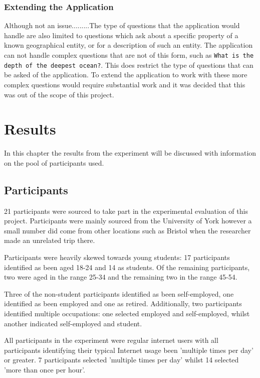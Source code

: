 \documentclass[authoryearcitations]{UoYCSproject}
\begin{document}
\subsection{Extending the Application}
 

Although not an issue.........The type of questions that the application would handle are also limited to questions which ask about a specific property of a known geographical entity, or for a description of such an entity. The application can not handle complex questions that are not of this form, such as \texttt{What is the depth of the deepest ocean?}. This does restrict the type of questions that can be asked of the application. To extend the application to work with these more complex questions would require substantial work and it was decided that this was out of the scope of this project.


\newpage
\chapter{Results}
\label{sec:results}

In this chapter the results from the experiment will be discussed with information on the pool of participants used.

\section{Participants}
\label{sec:participants}

21 participants were sourced to take part in the experimental evaluation of this project. Participants were mainly sourced from the University of York however a small number did come from other locations such as Bristol when the researcher made an unrelated trip there.

Participants were heavily skewed towards young students: 17 participants identified as been aged 18-24 and 14 as students. Of the remaining participants, two were aged in the range 25-34 and the remaining two in the range 45-54.

Three of the non-student participants identified as been self-employed, one identified as been employed and one as retired. Additionally, two participants identified multiple occupations: one selected employed and self-employed, whilst another indicated self-employed and student.

All participants in the experiment were regular internet users with all participants identifying their typical Internet usage been 'multiple times per day' or greater. 7 participants selected 'multiple times per day' whilst 14 selected 'more than once per hour'.
\end{document}

